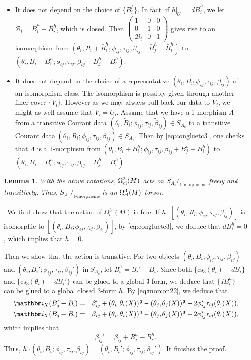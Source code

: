 \documentclass[letterpaper,10pt, oneside]{article} %
\newtheorem{lem}[thm]{Lemma}\newtheorem{lemma}[thm]{Lemma}
\newcommand{\cl}{\mathrm{cl}}
\newcommand{\pf}{\noindent{\bf Proof.}\ }
\newcommand{\ii}{\mathbbm i}
\newcommand{\cs}{\mathrm{cs}}
\newcommand{\huaB}{\mathcal{B}}%
\def\qed{\hfill ~\vrule height6pt width6pt depth0pt}
\begin{document}
\begin{itemize}
\item It does not depend on the choice of $\{B^h_i\}$. In fact, if $h|_{U_i}=d\bar{B}^h_i$, we let  $\huaB_i=\bar{B}^h_i-B^h_i$, which is closed. Then $\left(\begin{array}{ccc}
1&0&0\\
0&1&0\\
\huaB_i&0&1
\end{array}\right)$ gives rise to an isomorphism from $(\theta_i,
B_i+\bar{B}^h_i ;
\phi_{ij},\tau_{ij},\beta_{ij}+\bar{B}^h_j-\bar{B}^h_i )$ to
$(\theta_i, B_i+B^h_i;\phi_{ij},\tau_{ij},\beta_{ij}+B^h_j-B^h_i )$.

\item It does not depend on the choice of a representative $(\theta_i, B_i;\phi_{ij},\tau_{ij},\beta_{ij})$ of an isomorphism class.  The isomorphism is possibly given through another finer cover $\{V_i\}$. However as we may always pull back our data to $V_i$, we might as well assume that $V_i=U_i$.  Assume that we have a 1-morphism $\Lambda$ from a transitive Courant data $(\theta_i, \widetilde{B}_i;\phi_{ij},\tau_{ij},\widetilde{\beta}_{ij})\in S_{A_c}$ to a transitive Courant data $(\theta_i, B_i;\phi_{ij},\tau_{ij},\beta_{ij})\in S_{A_c}$.
  Then by \eqref{eq:congluetc3}, one checks that $\Lambda$ is a 1-morphism from $(\theta_i, \widetilde{B}_i+B^h_i;\phi_{ij},\tau_{ij},\widetilde{\beta}_{ij}+B^h_j-B^h_i)$ to $(\theta_i, B_i+B^h_i;\phi_{ij},\tau_{ij},\beta_{ij}+B^h_j-B^h_i)$.
\end{itemize}

  \begin{lem}\label{thm:catorsor}
   With the above notations, $\Omega^3_{\rm cl}(M)$ acts on  $S_{A_c}/_{1\mbox{-morphisms}}$ freely and transitively. Thus, $S_{A_c}/_{1\mbox{-morphisms}}$ is an $\Omega^3_{\rm cl}(M)$-torsor.
  \end{lem}
\pf We first show that the action of $\Omega^3_{\cl}(M)$ is free.
If $h\cdot [(\theta_i, B_i;\phi_{ij},\tau_{ij},\beta_{ij})]$ is isomorphic to $[(\theta_i, B_i;\phi_{ij},\tau_{ij},\beta_{ij})]$, by \eqref{eq:congluetc3}, we deduce that $dB^h_i=0$, which implies that $h=0.$

Then we show that the action is transitive. For  two objects $ (\theta_i, B_i;\phi_{ij},\tau_{ij},\beta_{ij})$ and $ (\theta_i, B_i';\phi_{ij},\tau_{ij},\beta_{ij}')$ in $S_{A_c}$, let $B^h_i=B_i'-B_i$. Since both $\{\cs_3(\theta_i)-dB_i\}$ and $\{\cs_3(\theta_i)-dB_i'\}$ can be glued to a global 3-form, we deduce that $\{dB^h_i\}$ can be glued to a global closed 3-form $h$. By \eqref{eq:morcon22}, we deduce that
\begin{eqnarray*}
\ii_X(B_j'-B_i')&=&\beta_{ij}'+(\theta_i,\theta_i(X))^\g-(\theta_j,\theta_j(X))^\g-2\phi_{ij}^\star\tau_{ij}(\theta_j(X)),\\
\ii_X(B_j-B_i)&=&\beta_{ij}+(\theta_i,\theta_i(X))^\g-(\theta_j,\theta_j(X))^\g-2\phi_{ij}^\star\tau_{ij}(\theta_j(X)),
\end{eqnarray*}
which implies that $$\beta_{ij}'=\beta_{ij}+B^h_j-B^h_i.$$
Thus, $h\cdot (\theta_i, B_i;\phi_{ij},\tau_{ij},\beta_{ij})= (\theta_i, B_i';\phi_{ij},\tau_{ij},\beta_{ij}')$. It finishes the proof.\qed
\end{document}
